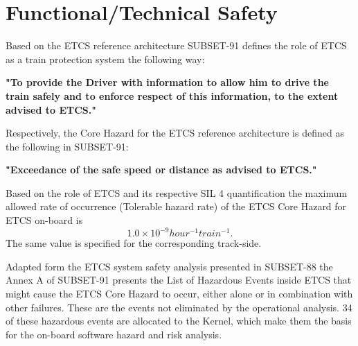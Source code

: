 \documentclass{template/openetcs_report}
\begin{document}
\section{Functional/Technical Safety}

Based on the ETCS reference architecture SUBSET-91 defines the role of ETCS as a train protection system the following way:

\begin{center}
\textbf{"To provide the Driver with information to allow  him to drive the train safely and to enforce respect of this information, to the extent advised to ETCS."}
\end{center}

Respectively, the Core Hazard for the ETCS reference architecture is defined as the following in SUBSET-91:
\begin{center}
\textbf{"Exceedance of the safe speed or distance as advised to ETCS."}
\end{center}

Based on the role of ETCS and its respective SIL 4 quantification the maximum allowed rate of occurrence (Tolerable hazard rate) of the ETCS Core Hazard for ETCS on-board is
\[1.0\times10^{-9} hour^{-1} train^{-1}.\]
The same value is specified for the corresponding track-side.

Adapted form the ETCS system safety analysis presented in SUBSET-88 the Annex A of SUBSET-91 presents the List of Hazardous Events inside ETCS that might cause the ETCS Core Hazard to occur, either alone or in combination with other failures. These are the events not eliminated by the operational analysis. 34 of these hazardous events are allocated to the Kernel, which make them the basis for the on-board software hazard and risk analysis. 
\end{document}
